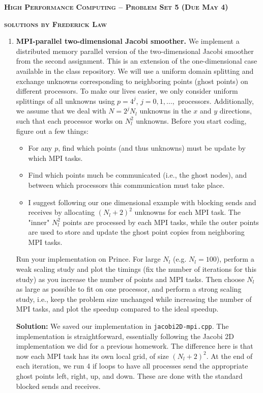 \documentclass[10pt]{article}
\begin{document}
{ \large \textbf{\textsc{High Performance Computing -- Problem Set 5 (Due May 4)}}}

{ \large \textbf{\textsc{solutions by Frederick Law}}}

\thispagestyle{empty}
\vspace{0.1in}


\begin{enumerate}

\item \textbf{MPI-parallel two-dimensional Jacobi smoother.} We implement a distributed memory parallel version of the two-dimensional Jacobi smoother from the second assignment. This is an extension of the one-dimensional case available in the class repository. We will use a uniform domain splitting and exchange unknowns corresponding to neighboring points (ghost points) on different processors. To make our lives easier, we only consider uniform splittings of all unknowns using $p = 4^{j}$, $j=0, 1, \dotsc, $ processors. Additionally, we assume that we deal with $N = 2^{j} N_{l}$ unknowns in the $x$ and $y$ directions, such that each processor works on $N_{l}^{2}$ unknowns. Before you start coding, figure out a few things:
\begin{itemize}
	\item For any $p$, find which points (and thus unknowns) must be update by which MPI tasks.
	\item Find which points much be communicated (i.e., the ghost nodes), and between which processors this communication must take place.
	\item I suggest following our one dimensional example with blocking sends and receives by allocating $(N_{l} + 2)^{2}$ unknowns for each MPI task. The "inner" $N_{l}^{2}$ points are processed by each MPI tasks, while the outer points are used to store and update the ghost point copies from neighboring MPI tasks.
\end{itemize}

Run your implementation on Prince. For large $N_{l}$ (e.g. $N_{l} = 100$), perform a weak scaling study and plot the timings (fix the number of iterations for this study) as you increase the number of points and MPI tasks. Then choose $N_{l}$ as large as possible to fit on one processor, and perform a strong scaling study, i.e., keep the problem size unchanged while increasing the number of MPI tasks, and plot the speedup compared to the ideal speedup.

\textbf{Solution:} We saved our implementation in \texttt{jacobi2D-mpi.cpp}. The implementation is straightforward, essentially following the Jacobi 2D implementation we did for a previous homework. The difference here is that now each MPI task has its own local grid, of size $(N_{l}+2)^{2}$. At the end of each iteration, we run 4 if loops to have all processes send the appropriate ghost points left, right, up, and down. These are done with the standard blocked sends and receives. 




\end{enumerate}
\end{document}
